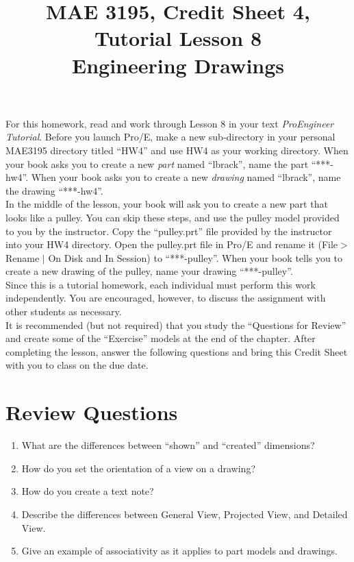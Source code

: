 \documentclass[12pt]{article}
\title{MAE 3195, Credit Sheet 4, Tutorial Lesson 8\\
Engineering Drawings}
\date{}
\begin{document}
\maketitle

For this homework, read and work through Lesson 8 in your text \textit{ProEngineer Tutorial}. Before you launch Pro/E, make a new sub-directory in your personal MAE3195 directory titled ``HW4'' and use HW4 as your working directory. When your book asks you to create a new \textit{part} named ``lbrack'', name the part ``***-hw4''. When your book asks you to create a new \textit{drawing} named ``lbrack'', name the drawing ``***-hw4''.\\
In the middle of the lesson, your book will ask you to create a new part that looks like a pulley. You can skip these steps, and use the pulley model provided to you by the instructor. Copy the ``pulley.prt'' file provided by the instructor into your HW4 directory. Open the pulley.prt file in Pro/E and rename it (File$>$Rename $|$ On Disk and In Session) to ``***-pulley''. When your book tells you to create a new drawing of the pulley, name your drawing ``***-pulley''.\\

Since this is a tutorial homework, each individual must perform this work independently. You are encouraged, however, to discuss the assignment with other students as necessary.\\

It is recommended (but not required) that you study the ``Questions for Review'' and create some of the ``Exercise'' models at the end of the chapter. After completing the lesson, answer the following questions and bring this Credit Sheet with you to class on the due date.

\pagebreak

\section*{Review Questions}
\begin{enumerate}
	\item What are the differences between ``shown'' and ``created'' dimensions?
	\vspace{1.25in}
	\item How do you set the orientation of a view on a drawing?
	\vspace{1.25in}
	\item How do you create a text note?
	\vspace{1.25in}
	\item Describe the differences between General View, Projected View, and Detailed View.
	\vspace{1.25in}
	\item Give an example of associativity as it applies to part models and drawings.
\end{enumerate}
\end{document}

